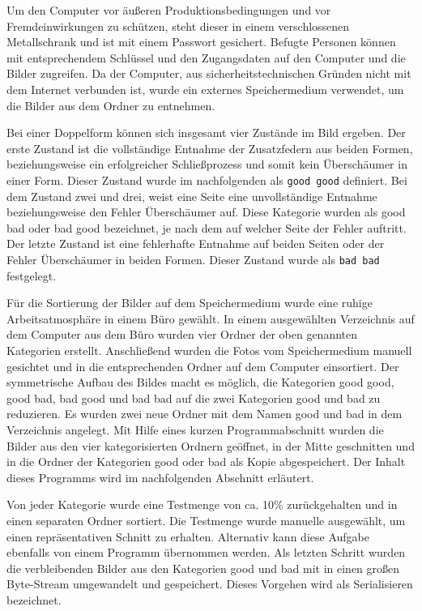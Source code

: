 Um den Computer vor äußeren Produktionsbedingungen und vor Fremdeinwirkungen zu
schützen, steht dieser in einem verschlossenen Metallschrank und ist mit einem Passwort
gesichert. Befugte Personen können mit entsprechendem Schlüssel und den Zugangsdaten
auf den Computer und die Bilder zugreifen. Da der Computer, aus sicherheitstechnischen
Gründen nicht mit dem Internet verbunden ist, wurde ein externes Speichermedium verwendet, 
um die Bilder aus dem Ordner zu entnehmen.

Bei einer Doppelform können sich insgesamt vier Zustände im Bild ergeben. Der erste
Zustand ist die vollständige Entnahme der Zusatzfedern aus beiden Formen, beziehungsweise
ein erfolgreicher Schließprozess und somit kein Überschäumer in einer Form. Dieser
Zustand wurde im nachfolgenden als \texttt{good good} definiert. Bei dem Zustand zwei und drei,
weist eine Seite eine unvollständige Entnahme beziehungsweise den Fehler
Überschäumer auf. Diese Kategorie wurden als good bad oder bad good bezeichnet, je nach dem auf
welcher Seite der Fehler auftritt. Der letzte Zustand ist eine fehlerhafte Entnahme auf
beiden Seiten oder der Fehler Überschäumer in beiden Formen. Dieser Zustand wurde als
\texttt{bad bad} festgelegt.

Für die Sortierung der Bilder auf dem Speichermedium wurde eine ruhige Arbeitsatmosphäre 
in einem Büro gewählt. In einem ausgewählten Verzeichnis auf dem Computer aus
dem Büro wurden vier Ordner der oben genannten Kategorien erstellt. Anschließend wurden 
die Fotos vom Speichermedium manuell gesichtet und in die entsprechenden Ordner
auf dem Computer einsortiert. Der symmetrische Aufbau des Bildes macht es möglich,
die Kategorien good good, good bad, bad good und bad bad auf die zwei Kategorien good
und bad zu reduzieren. Es wurden zwei neue Ordner mit dem Namen good und bad in
dem Verzeichnis angelegt. Mit Hilfe eines kurzen Programmabschnitt wurden die Bilder
aus den vier kategorisierten Ordnern geöffnet, in der Mitte geschnitten und in die Ordner
der Kategorien good oder bad als Kopie abgespeichert. Der Inhalt dieses Programms wird
im nachfolgenden Abschnitt erläutert.

Von jeder Kategorie wurde eine Testmenge von ca. 10\% zurückgehalten und in einen
separaten Ordner sortiert. Die Testmenge wurde manuelle ausgewählt, um einen repräsentativen 
Schnitt zu erhalten. Alternativ kann diese Aufgabe ebenfalls von einem
Programm übernommen werden. Als letzten Schritt wurden die verbleibenden Bilder aus
den Kategorien good und bad mit in einen großen Byte-Stream umgewandelt und gespeichert. 
Dieses Vorgehen wird als Serialisieren bezeichnet. \cite{Duden:2020}

